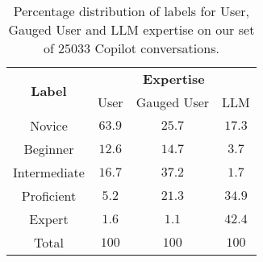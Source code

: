 \begin{table}[ht!]
\centering
\small
\begin{tabular}{@{}c|c|c|c|@{}}
\toprule
\multicolumn{1}{c|}{\multirow{2}{*}{\textbf{Label}}} & \multicolumn{3}{c|}{\textbf{Expertise}} \\
\multicolumn{1}{c|}{} & \multicolumn{1}{l|}{User} & \multicolumn{1}{l|}{Gauged User} & \multicolumn{1}{l|}{LLM}\\ \midrule
Novice & $63.9$ & $25.7$ & $17.3$ \\
Beginner & $12.6$ & $14.7$ & $3.7$ \\
Intermediate & $16.7$ & $37.2$ & $1.7$ \\
Proficient & $5.2$ & $21.3$ & $34.9$ \\
Expert & $1.6$ & $1.1$ & $42.4$ \\ \midrule
Total & $100$ & $100$ & $100$ \\ \bottomrule
\end{tabular}
\caption{Percentage distribution of labels for User, Gauged User and LLM expertise on our set of $25033$ Copilot conversations.}\label{expert_label_dist}
\end{table}
